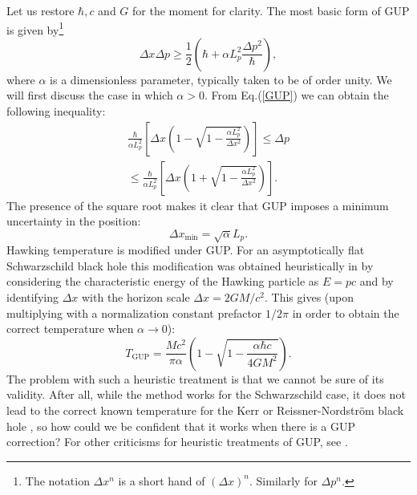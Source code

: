\documentclass[12pt,preprintnumbers, floatfix, preprintnumbers, letterpaper, superscriptaddress,nofootinbib]{revtex4-2}
\begin{document}
Let us restore $\hbar, c$ and $G$ for the moment for clarity.
The most basic form of GUP is given by\footnote{The notation $\Delta x^n$ is a short hand of $(\Delta x)^n$. Similarly for $\Delta p^n$.}
\begin{equation}\label{GUP}
\Delta x \Delta p \geqslant \frac{1}{2}\left(\hbar + \alpha L_p^2 \frac{\Delta p^2}{\hbar}\right),
\end{equation}
where $\alpha$ is a dimensionless parameter, typically taken to be of order unity. We will first discuss the case in which $\alpha > 0$.
From Eq.(\ref{GUP}) we can obtain the following inequality:
\begin{multline}\label{inequa}
\frac{\hbar}{\alpha L_p^2}\left[\Delta x \left(1-\sqrt{1-\frac{\alpha L_p^2}{\Delta x^2}}\right)\right] \leqslant \Delta p \\ 
\leqslant \frac{\hbar}{\alpha L_p^2} \left[\Delta x \left(1+\sqrt{1-\frac{\alpha L_p^2}{ \Delta x^2}}\right)\right].
\end{multline}
The presence of the square root makes it clear that GUP imposes a minimum uncertainty in the position: 
\begin{equation}\label{xmin}
\Delta x_\text{min} = {\sqrt{\alpha}}{L_p}.
\end{equation} 
Hawking temperature is modified under GUP. For an asymptotically flat Schwarzschild black hole this modification was obtained heuristically in \cite{0106080} by considering the characteristic energy of the Hawking particle as $E = pc$ and by identifying $\Delta x$ with the horizon scale $\Delta x = 2GM/c^2$. This gives (upon multiplying with a normalization constant prefactor $1/2\pi$ in order to obtain the correct temperature when $\alpha \to 0$):
\begin{equation}\label{TGUP}
T_\text{GUP} = \frac{Mc^2}{\pi \alpha}\left(1-\sqrt{1-\frac{\alpha \hbar c}{4GM^2}}\right).
\end{equation}
The problem with such a heuristic treatment is that we cannot be sure of its validity. After all, while the method works for the Schwarzschild case, it does not lead to the correct known temperature for the Kerr or Reissner-Nordstr\"om black hole \cite{2407.21114}, so how could we be confident that it works when there is a GUP correction? For other criticisms for heuristic treatments of GUP, see \cite{2005.12075,2303.10719,2305.16193}.
\end{document}
